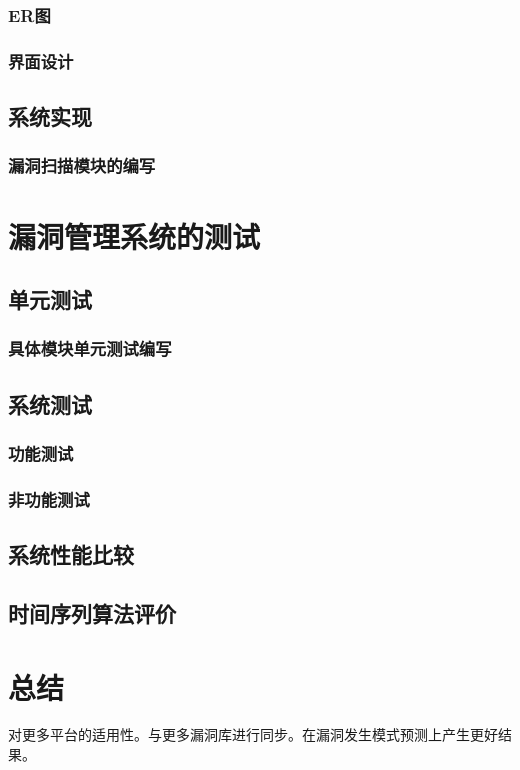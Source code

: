 \documentclass[a4paper]{ctexrep}
\begin{document}
			\subsection{ER图}
			\subsection{界面设计}

		\section{系统实现}
			\subsection{漏洞扫描模块的编写}
	\chapter{漏洞管理系统的测试}
		\section{单元测试}
			\subsection{具体模块单元测试编写}
		\section{系统测试}
			\subsection{功能测试}
			\subsection{非功能测试}
		\section{系统性能比较}
		\section{时间序列算法评价}
	\chapter{总结}
	对更多平台的适用性。与更多漏洞库进行同步。在漏洞发生模式预测上产生更好结果。
	
\end{document}
